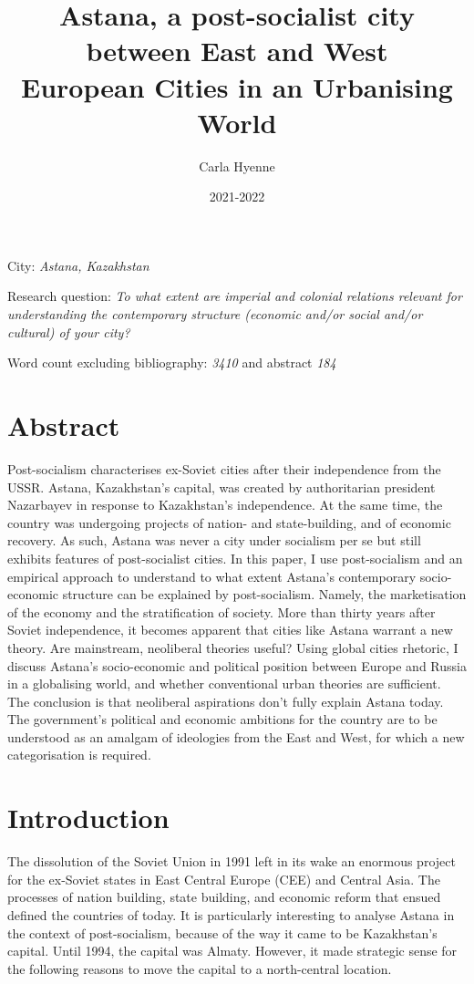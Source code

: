 \documentclass{article}
\title{Astana, a post-socialist city between East and West 
\\[4ex] \large European Cities in an Urbanising World}
\author{Carla Hyenne}
\date{2021-2022}
\begin{document}
\singlespacing 
\maketitle 
\thispagestyle{empty}


City: \textit{Astana, Kazakhstan}

Research question: \textit{To what extent are imperial and colonial relations relevant for understanding the contemporary structure (economic and/or social and/or cultural) of your city?}

Word count excluding bibliography: \textit{3410} and abstract \textit{184} 

\section{Abstract}
\doublespacing
Post-socialism characterises ex-Soviet cities after their independence from the USSR.
Astana, Kazakhstan's capital, was created by authoritarian president Nazarbayev in response to Kazakhstan's independence. At the same time, the country was undergoing projects of nation- and state-building, and of economic recovery. As such, Astana was never a city under socialism per se but still exhibits features of post-socialist cities. In this paper, I use post-socialism and an empirical approach to understand to what extent Astana's contemporary socio-economic structure can be explained by post-socialism. 
Namely, the marketisation of the economy and the stratification of society.
More than thirty years after Soviet independence, it becomes apparent that cities like Astana warrant a new theory. 
Are mainstream, neoliberal theories useful? Using global cities rhetoric, I discuss Astana's socio-economic and political position between Europe and Russia in a globalising world, and whether conventional urban theories are sufficient. 
The conclusion is that neoliberal aspirations don't fully explain Astana today. The government's political and economic ambitions for the country are to be understood as an amalgam of ideologies from the East and West, for which a new categorisation is required.


\pagebreak
\setcounter{page}{1}
\doublespacing

\section{Introduction} 

The dissolution of the Soviet Union in 1991 left in its wake an enormous project for the ex-Soviet states in East Central Europe (CEE) and Central Asia. The processes of nation building, state building, and economic reform that ensued defined the countries of today. It is particularly interesting to analyse Astana in the context of post-socialism, because of the way it came to be Kazakhstan's capital. 
Until 1994, the capital was Almaty. However, it made strategic sense for the following reasons to move the capital to a north-central location. 
\end{document}
